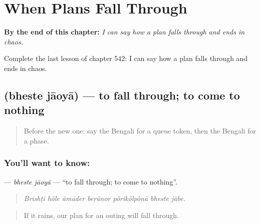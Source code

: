 
\chapter{When Plans Fall Through}
\label{ch:bn-when-plans-fall-through}

\begin{chapteropening}
\textbf{By the end of this chapter:} \emph{I can say how a plan falls through and ends in chaos.}

Complete the last lesson of chapter 542: I can say how a plan falls through and ends in chaos.
\end{chapteropening}

\section[\texorpdfstring{\bn{ভেস্তে} \bn{যাওয়া} (bheste jāoyā)}{ভেস্তে যাওয়া (bheste jāoyā)}]{  (bheste jāoyā) — to fall through; to come to nothing}

\label{lesson:BN-C542-bheste-jaoya}



\begin{quote}
Before the new one: say the Bengali for a queue token, then the Bengali for a phase.
\end{quote}

\subsection*{You'll want to know:  }
\textbf{ } — \emph{bheste jāoyā} — \textquotedblleft{}to fall through; to come to nothing\textquotedblright{}.

\begin{quote}
      
\end{quote}

\begin{quote}
\emph{Brishṭi hôle āmāder beṛānor pôrikôlpônā bheste jābe.}
\end{quote}

\begin{quote}
If it rains, our plan for an outing will fall through.
\end{quote}

